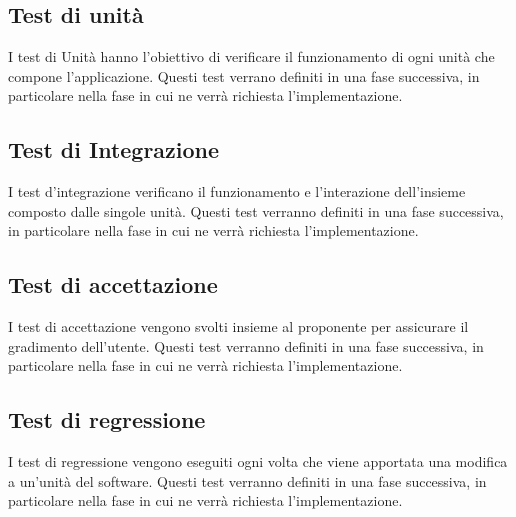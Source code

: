 \subsection{Test di unità}
    I test di Unità hanno l'obiettivo di verificare il funzionamento di ogni unità che compone l'applicazione. Questi test verrano definiti in una fase successiva, in particolare nella fase in cui ne verrà richiesta l'implementazione.
    
\subsection{Test di Integrazione}
    I test d'integrazione verificano il funzionamento e l'interazione dell'insieme composto dalle singole unità. Questi test verranno definiti in una fase successiva, in particolare nella fase in cui ne verrà richiesta l'implementazione.
    
\subsection{Test di accettazione}
    I test di accettazione vengono svolti insieme al proponente per assicurare il gradimento dell'utente. Questi test verranno definiti in una fase successiva, in particolare nella fase in cui ne verrà richiesta l'implementazione.
    
\subsection{Test di regressione}
    I test di regressione vengono eseguiti ogni volta che viene apportata una modifica a un'unità del software. Questi test verranno definiti in una fase successiva, in particolare nella fase in cui ne verrà richiesta l'implementazione.


